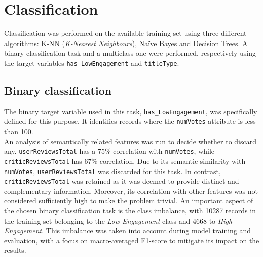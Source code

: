 
\chapter{Classification}
\label{ch:capitolo3}
Classification was performed on the available training set using three different algorithms: K-NN (\textit{K-Nearest Neighbours}), Naïve Bayes and Decision Trees.
A binary classification task and a multiclass one were performed, respectively using the target variables \texttt{has\_LowEngagement} and \texttt{titleType}.


\section{Binary classification}\label{sec:binary_classification}
The binary target variable used in this task, \texttt{has\_LowEngagement}, was specifically defined for this purpose. 
It identifies records where the \texttt{numVotes} attribute is less than 100.\\

An analysis of semantically related features was run to decide whether to discard any.
\texttt{userReviewsTotal} has a 75\% correlation with
\texttt{numVotes}, while \texttt{criticReviewsTotal} has 67\% correlation.
Due to its semantic similarity with \texttt{numVotes}, \texttt{userReviewsTotal} was discarded for this task.
In contrast, \texttt{criticReviewsTotal} was retained as it was deemed to provide distinct and complementary information. 
Moreover, its correlation with other features was not considered sufficiently high to make the problem trivial.
An important aspect of the chosen binary classification task is the class imbalance, with 10287 records in the training set
belonging to the \textit{Low Engagement} class and 4668 to \textit{High Engagement}.
This imbalance was taken into account during model training and evaluation, with a focus on
macro-averaged F1-score to mitigate its impact on the results.


